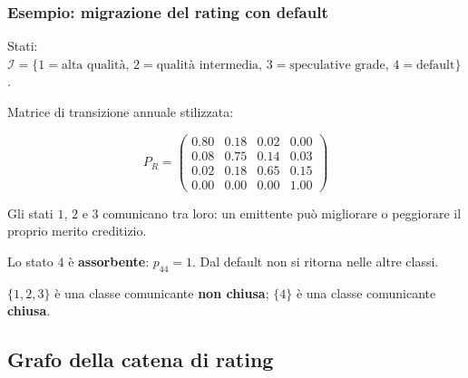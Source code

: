\begin{frame}%
%

\frametitle{Esempio: migrazione del rating con default}%
%

%


Stati: $\mathcal{I} = \{ 1=\text{alta qualit\`{a}}, \, 2=\text{qualit\`{a}
intermedia}, \, 3=\text{speculative grade}, \, 4=\text{default} \}$.

\medskip

Matrice di transizione annuale stilizzata:%

\[
P_{R} =
\begin{pmatrix}
0.80 & 0.18 & 0.02 & 0.00\\
0.08 & 0.75 & 0.14 & 0.03\\
0.02 & 0.18 & 0.65 & 0.15\\
0.00 & 0.00 & 0.00 & 1.00
\end{pmatrix}
\]


\medskip

\begin{stepitemize}
\item Gli stati $1$, $2$ e $3$ comunicano tra loro: un emittente pu\`{o}
migliorare o peggiorare il proprio merito creditizio.

\item Lo stato $4$ \`{e} \textbf{assorbente}: $p_{44}=1$. Dal default non si
ritorna nelle altre classi.

\item $\{1,2,3\}$ \`{e} una classe comunicante \textbf{non chiusa}; $\{4\}$
\`{e} una classe comunicante \textbf{chiusa}.
\end{stepitemize}

%

\transboxout
\end{frame}%




\subsection{Grafo della catena di rating}%

